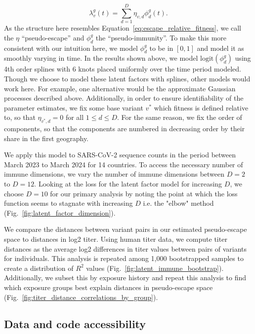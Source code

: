 \documentclass[11pt,oneside,letterpaper]{article}
\newcommand{\varEscape}{\eta}
\begin{document}
\begin{equation}
    \lambda_{v}^{g}(t) = \sum_{d=1}^{D} \varEscape_{v,d} \phi_{d}^{g}(t).
\end{equation}
As the structure here resembles Equation~\ref{eq:escape_relative_fitness}, we call the $\varEscape$ ``pseudo-escape'' and $\phi_{d}^{g}$ the ``pseudo-immunity''.
To make this more consistent with our intuition here, we model $\phi_{d}^{g}$ to be in $[0,1]$ and model it as smoothly varying in time.
In the results shown above, we model $\text{logit}(\phi_{d}^{g})$ using 4th order splines with 6 knots placed uniformly over the time period modeled.
Though we choose to model these latent factors with splines, other models would work here.
For example, one alternative would be the approximate Gaussian processes described above.
Additionally, in order to ensure identifiability of the parameter estimates, we fix some base variant $v^*$ which fitness is defined relative to, so that $\varEscape_{v^*, d} = 0$ for all $1\leq d\leq D$.
For the same reason, we fix the order of components, so that the components are numbered in decreasing order by their share in the first geography.

We apply this model to SARS-CoV-2 sequence counts in the period between March 2023 to March 2024 for 14 countries.
To access the necessary number of immune dimensions, we vary the number of immune dimensions between $D=2$ to $D=12$.
Looking at the loss for the latent factor model for increasing $D$, we choose $D=10$ for our primary analysis by noting the point at which the loss function seems to stagnate with increasing $D$ i.e. the "elbow" method (Fig.~\ref{fig:latent_factor_dimension}).

We compare the distances between variant pairs in our estimated pseudo-escape space to distances in log2 titer.
Using human titer data, we compute titer distances as the average log2 differences in titer values between pairs of variants for individuals.
This analysis is repeated among 1,000 bootstrapped samples to create a distribution of $R^2$ values (Fig.~\ref{fig:latent_immune_bootstrap}).
Additionally, we subset this by exposure history and repeat this analysis to find which exposure groups best explain distances in pseudo-escape space (Fig.~\ref{fig:titer_distance_correlations_by_group}).

\subsection*{Data and code accessibility}
\end{document}
